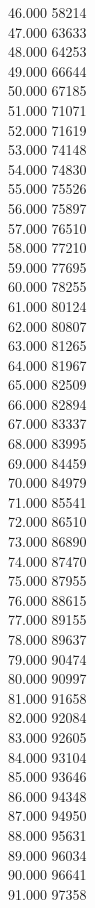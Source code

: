 { 46.000	58214 \\
 47.000	63633 \\
 48.000	64253 \\
 49.000	66644 \\
 50.000	67185 \\
 51.000	71071 \\
 52.000	71619 \\
 53.000	74148 \\
 54.000	74830 \\
 55.000	75526 \\
 56.000	75897 \\
 57.000	76510 \\
 58.000	77210 \\
 59.000	77695 \\
 60.000	78255 \\
 61.000	80124 \\
 62.000	80807 \\
 63.000	81265 \\
 64.000	81967 \\
 65.000	82509 \\
 66.000	82894 \\
 67.000	83337 \\
 68.000	83995 \\
 69.000	84459 \\
 70.000	84979 \\
 71.000	85541 \\
 72.000	86510 \\
 73.000	86890 \\
 74.000	87470 \\
 75.000	87955 \\
 76.000	88615 \\
 77.000	89155 \\
 78.000	89637 \\
 79.000	90474 \\
 80.000	90997 \\
 81.000	91658 \\
 82.000	92084 \\
 83.000	92605 \\
 84.000	93104 \\
 85.000	93646 \\
 86.000	94348 \\
 87.000	94950 \\
 88.000	95631 \\
 89.000	96034 \\
 90.000	96641 \\
 91.000	97358 \\
}
